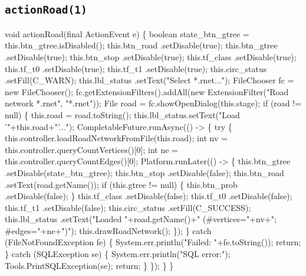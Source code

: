 \subsection{\texttt{actionRoad(1)}}
\nwenddocs{}\endmoddef{}
void actionRoad(final ActionEvent e) \{
  boolean state_btn_gtree = this.btn_gtree.isDisabled();
  this.btn_road     .setDisable(true);
  this.btn_gtree    .setDisable(true);
  this.btn_stop     .setDisable(true);
  this.tf_class     .setDisable(true);
  this.tf_t0        .setDisable(true);
  this.tf_t1        .setDisable(true);
  this.circ_status  .setFill(C_WARN);
  this.lbl_status   .setText("Select *.rnet...");
  FileChooser fc = new FileChooser();
  fc.getExtensionFilters().addAll(new ExtensionFilter("Road network *.rnet", "*.rnet"));
  File road = fc.showOpenDialog(this.stage);
  if (road != null) \{
    this.road = road.toString();
    this.lbl_status.setText("Load '"+this.road+"'...");
    CompletableFuture.runAsync(() -> \{
      try \{
        this.controller.loadRoadNetworkFromFile(this.road);
        int nv = this.controller.queryCountVertices()[0];
        int ne = this.controller.queryCountEdges()[0];
        Platform.runLater(() -> \{
          this.btn_gtree    .setDisable(state_btn_gtree);
          this.btn_stop     .setDisable(false);
          this.btn_road     .setText(road.getName());
          if (this.gtree != null) \{
            this.btn_prob   .setDisable(false);
          \}
          this.tf_class     .setDisable(false);
          this.tf_t0        .setDisable(false);
          this.tf_t1        .setDisable(false);
          this.circ_status  .setFill(C_SUCCESS);
          this.lbl_status   .setText("Loaded "+road.getName()+" (#vertices="+nv+"; #edges="+ne+")");
          this.drawRoadNetwork();
        \});
      \} catch (FileNotFoundException fe) \{
        System.err.println("Failed: "+fe.toString());
        return;
      \} catch (SQLException se) \{
        System.err.println("SQL error:");
        Tools.PrintSQLException(se);
        return;
      \}
    \});
  \}
\}
\nwendcode{}\nwdocspar

